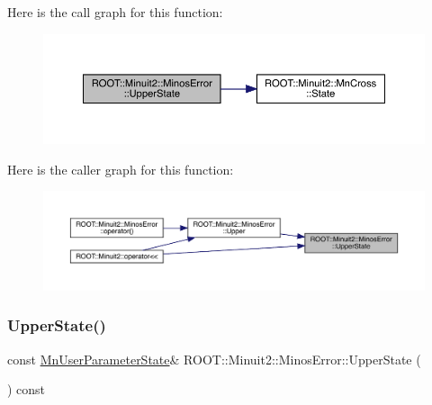 Here is the call graph for this function\+:
\nopagebreak
\begin{figure}[H]
\begin{center}
\leavevmode
\includegraphics[width=350pt]{d2/dd1/classROOT_1_1Minuit2_1_1MinosError_a89164c38dd7596c3164f1083eb9aac72_cgraph}
\end{center}
\end{figure}
Here is the caller graph for this function\+:
\nopagebreak
\begin{figure}[H]
\begin{center}
\leavevmode
\includegraphics[width=350pt]{d2/dd1/classROOT_1_1Minuit2_1_1MinosError_a89164c38dd7596c3164f1083eb9aac72_icgraph}
\end{center}
\end{figure}
\mbox{\label{classROOT_1_1Minuit2_1_1MinosError_a89164c38dd7596c3164f1083eb9aac72}} 
\subsubsection{\texorpdfstring{UpperState()}{UpperState()}\hspace{0.1cm}{\footnotesize\ttfamily [3/3]}}
{\footnotesize\ttfamily const \mbox{\hyperlink{classROOT_1_1Minuit2_1_1MnUserParameterState}{Mn\+User\+Parameter\+State}}\& R\+O\+O\+T\+::\+Minuit2\+::\+Minos\+Error\+::\+Upper\+State (\begin{DoxyParamCaption}{ }\end{DoxyParamCaption}) const\hspace{0.3cm}{\ttfamily [inline]}}

